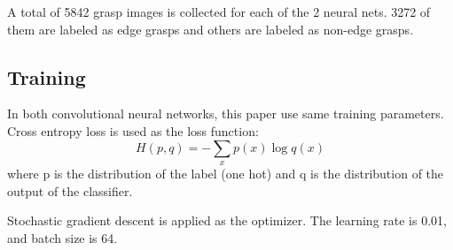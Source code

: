 \documentclass[letterpaper]{article} %
\begin{document}
A total of 5842 grasp images is collected for each of the 2 neural nets. 3272 of them are labeled as edge grasps and others are labeled as non-edge grasps.

\subsection{Training}
In both convolutional neural networks, this paper use same training parameters. Cross entropy loss is used as the loss function: 
\begin{equation}
    H(p, q)=-\sum_x p(x)\log q(x)
\end{equation}
where p is the distribution of the label (one hot) and q is the distribution of the output of the classifier.

Stochastic gradient descent is applied as the optimizer. The learning rate is 0.01, and batch size is 64. 
\end{document}
